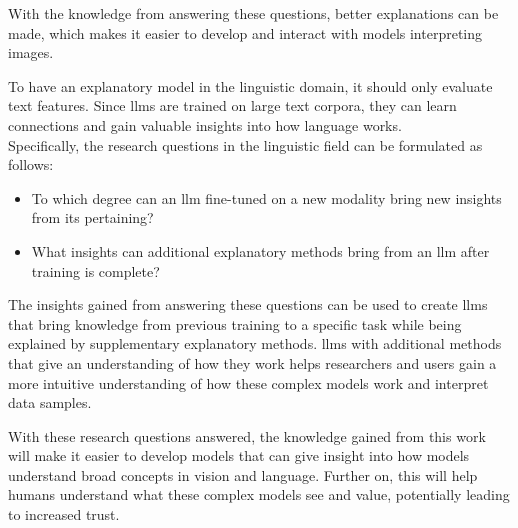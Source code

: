 With the knowledge from answering these questions, better explanations can be made, which makes it easier to develop and interact with models interpreting images. 


To have an explanatory model in the linguistic domain, it should only evaluate text features. Since \glspl{llm} are trained on large text corpora, they can learn connections and gain valuable insights into how language works. \\
Specifically, the research questions in the linguistic field can be formulated as follows:

\begin{itemize}
    \item To which degree can an \gls{llm} fine-tuned on a new modality bring new insights from its pertaining?

    \item What insights can additional explanatory methods bring from an \gls{llm} after training is complete?
\end{itemize}

The insights gained from answering these questions can be used to create \glspl{llm} that bring knowledge from previous training to a specific task while being explained by supplementary explanatory methods. \glspl{llm} with additional methods that give an understanding of how they work helps researchers and users gain a more intuitive understanding of how these complex models work and interpret data samples. 





With these research questions answered, the knowledge gained from this work will make it easier to develop models that can give insight into how models understand broad concepts in vision and language. 
Further on, this will help humans understand what these complex models see and value, potentially leading to increased trust.


